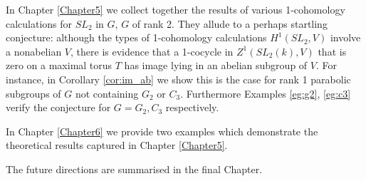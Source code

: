 In Chapter \ref{Chapter5} we collect together the results of various 1-cohomology calculations for $SL_2$ in $G$, $G$ of rank 2. They allude to a perhaps startling conjecture: although the types of 1-cohomology calculations $H^1(SL_2, V)$ involve a nonabelian $V$, there is evidence that a 1-cocycle in $Z^1(SL_2(k), V)$ that is zero on a maximal torus $T$ has image lying in an abelian subgroup of $V$. For instance, in Corollary \ref{cor:im_ab} we show this is the case for rank 1 parabolic subgroups of $G$ not containing $G_2$ or $C_3$. Furthermore Examples \ref{eg:g2}, \ref{eg:c3} verify the conjecture for $G = G_2, C_3$ respectively.

In Chapter \ref{Chapter6} we provide two examples which demonstrate the theoretical results captured in Chapter \ref{Chapter5}.

The future directions are summarised in the final Chapter.
